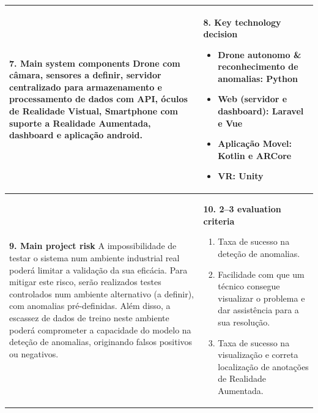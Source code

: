\documentclass[11pt, a4paper]{article}
\begin{document}
\begin{tabularx}{\textwidth}{>{\raggedright\arraybackslash}X | >{\raggedright\arraybackslash}X}
\midrule
\textcolor{brandblue}{\textbf{7. Main system components}} \newline
Drone com câmara, sensores a definir, servidor centralizado para armazenamento e processamento de dados com API, óculos de Realidade Vistual, Smartphone com suporte a Realidade Aumentada, dashboard e aplicação android.
& 
\textcolor{brandblue}{\textbf{8. Key technology decision}}
\begin{itemize}
    \item \textbf{Drone autonomo \& reconhecimento de anomalias:} Python
    \item \textbf{Web (servidor e dashboard):} Laravel e Vue
    \item \textbf{Aplicação Movel:} Kotlin e ARCore
    \item \textbf{VR:} Unity
\end{itemize} \\[2.5cm]

\midrule
\textcolor{brandblue}{\textbf{9. Main project risk}} \newline
A impossibilidade de testar o sistema num ambiente industrial real poderá limitar a validação da sua eficácia. Para mitigar este risco, serão realizados testes controlados num ambiente alternativo (a definir), com anomalias pré-definidas. Além disso, a escassez de dados de treino neste ambiente poderá comprometer a capacidade do modelo na deteção de anomalias, originando falsos positivos ou negativos.
  &
\textcolor{brandblue}{\textbf{10. 2--3 evaluation criteria}} 
\begin{enumerate}
    \item Taxa de sucesso na deteção de anomalias.
    \item Facilidade com que um técnico consegue visualizar o problema e dar assistência para a sua resolução.
    \item Taxa de sucesso na visualização e correta localização de anotações de Realidade Aumentada.

\end{enumerate}
  \\

\bottomrule
\end{tabularx}
\end{document}
